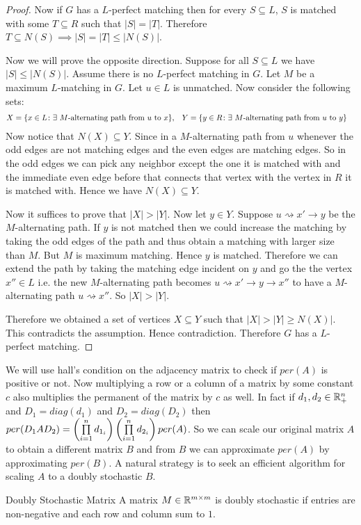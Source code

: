 \begin{proof}
	Now if $G$ has a $L$-perfect matching then for every $S\subseteq L$, $S$ is matched with some $T\subseteq R$ such that $|S|=|T|$. Therefore $T\subseteq N(S)\implies |S|=|T|\leq |N(S)|$.
	
	Now we will prove the opposite direction. Suppose for all $S\subseteq L$ we have $|S|\leq |N(S)|$. Assume there is no $L$-perfect matching in $G$. Let $M$ be a maximum $L$-matching in $G$. Let $u\in L$ is unmatched. Now consider the following sets:\begin{align*}
		X&=\{x\in L\colon \exists\text{ $M$-alternating path from $u$ to $x$}\}, &		Y&=\{y\in R\colon \exists\text{ $M$-alternating path from $u$ to $y$}\}		
	\end{align*}
Now notice that $N(X)\subseteq Y$. Since in a $M$-alternating path from $u$ whenever the odd edges are not matching edges and the even edges are matching edges. So in the odd edges we can pick any neighbor except the one it is matched with and the immediate even edge before that connects that vertex with the vertex in $R$ it is matched with. Hence we have $N(X)\subseteq Y$.

Now it suffices to prove that $|X|>|Y|$. Now let $y\in Y$. Suppose $u\rightsquigarrow x'\to y$ be the $M$-alternating path. If $y$ is not matched then we could increase the matching by taking the odd edges of the path and thus obtain a matching with larger size than $M$. But $M$ is maximum matching. Hence $y$ is matched. Therefore we can extend the path by taking the matching edge incident on $y$ and go the the vertex $x''\in L$ i.e. the new $M$-alternating path becomes $u\rightsquigarrow x'\to y\to x''$ to have a $M$-alternating path $u\rightsquigarrow x''$. So $|X|>|Y|$.

Therefore we obtained a set of vertices $X\subseteq Y$ such that $|X|>|Y|\geq N(X)|$. This contradicts the assumption. Hence contradiction. Therefore $G$ has a $L$-perfect matching. 
\end{proof}

We will use hall's condition on the adjacency matrix to check if $per(A)$ is positive or not. Now multiplying a row or a column of a matrix by some constant $c$ also multiplies the permanent of the matrix by $c$ as well. In fact if $d_1,d_2\in\mathbb{R}_+^n$ and $D_1=diag(d_1)$ and $D_2=diag(D_2)$  then $per(D_1AD_2)=\left(\prod\limits_{i=1}^nd_{1_i}\right)\left(\prod\limits_{i=1}^nd_{2_i}\right)per(A)$. So we can scale our original matrix $A$ to obtain a different matrix $B$ and from $B$ we can approximate $per(A)$ by approximating $per(B)$. A natural strategy is to seek an efficient algorithm for scaling $A$ to a doubly stochastic $B$.
\begin{Definition}{Doubly Stochastic Matrix}{}
	A matrix $M\in\mathbb{R}^{m\times m}$ is doubly stochastic if entries are non-negative and each row and column sum to $1$.
\end{Definition}

